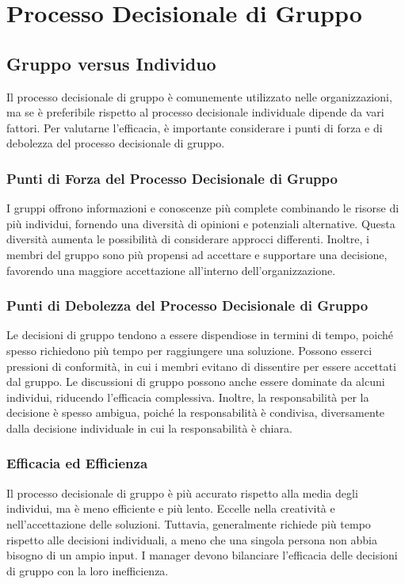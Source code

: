 \documentclass{article}
\begin{document}
\section{Processo Decisionale di Gruppo}
\subsection{Gruppo versus Individuo}
Il processo decisionale di gruppo è comunemente utilizzato nelle organizzazioni, ma se è preferibile rispetto al processo decisionale individuale dipende da vari fattori. Per valutarne l'efficacia, è importante considerare i punti di forza e di debolezza del processo decisionale di gruppo.

\subsubsection{Punti di Forza del Processo Decisionale di Gruppo}
I gruppi offrono informazioni e conoscenze più complete combinando le risorse di più individui, fornendo una diversità di opinioni e potenziali alternative. Questa diversità aumenta le possibilità di considerare approcci differenti. Inoltre, i membri del gruppo sono più propensi ad accettare e supportare una decisione, favorendo una maggiore accettazione all'interno dell'organizzazione.

\subsubsection{Punti di Debolezza del Processo Decisionale di Gruppo}
Le decisioni di gruppo tendono a essere dispendiose in termini di tempo, poiché spesso richiedono più tempo per raggiungere una soluzione. Possono esserci pressioni di conformità, in cui i membri evitano di dissentire per essere accettati dal gruppo. Le discussioni di gruppo possono anche essere dominate da alcuni individui, riducendo l'efficacia complessiva. Inoltre, la responsabilità per la decisione è spesso ambigua, poiché la responsabilità è condivisa, diversamente dalla decisione individuale in cui la responsabilità è chiara.

\subsubsection{Efficacia ed Efficienza}
Il processo decisionale di gruppo è più accurato rispetto alla media degli individui, ma è meno efficiente e più lento. Eccelle nella creatività e nell'accettazione delle soluzioni. Tuttavia, generalmente richiede più tempo rispetto alle decisioni individuali, a meno che una singola persona non abbia bisogno di un ampio input. I manager devono bilanciare l'efficacia delle decisioni di gruppo con la loro inefficienza.
\end{document}
